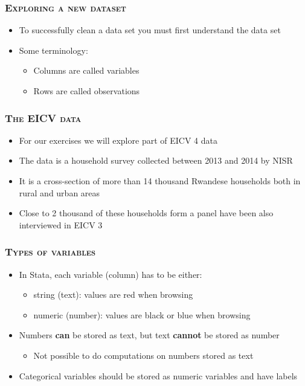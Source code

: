 \documentclass[10pt]{beamer}
\begin{document}
	\begin{frame}
		\frametitle{\textsc{Exploring a new dataset}}
		\begin{itemize}
			\item To successfully clean a data set you must first understand the data set
			\item Some terminology:
			\begin{itemize}
				\item Columns are called variables
				\item Rows are called observations
			\end{itemize}
		\end{itemize}
	\end{frame}
		
		
	\begin{frame}
		\frametitle{\textsc{The EICV data}}
		\begin{itemize}
			\item For our exercises we will explore part of EICV 4 data
			\item The data is a household survey collected between 2013 and 2014 by NISR
			\item It is a cross-section of more than 14 thousand Rwandese households both in rural and urban areas
			\item Close to 2 thousand of these households form a panel have been also interviewed in EICV 3		
		\end{itemize}
	\end{frame}

	\begin{frame}
		\frametitle{\textsc{Types of variables}}
	
		\begin{itemize}
			\item 	In Stata, each variable (column) has to be either:
			\begin{itemize}
				\item string (text): values are red when browsing
				\item numeric (number): values are black or blue when browsing
			\end{itemize}
			\item Numbers \textbf{can} be stored as text, but text \textbf{cannot} be stored as number
			\begin{itemize}
				\item Not possible to do computations on numbers stored as text 		
			\end{itemize}
			\item Categorical variables should be stored as numeric variables and have labels
		\end{itemize}
	\end{frame}
\end{document}
